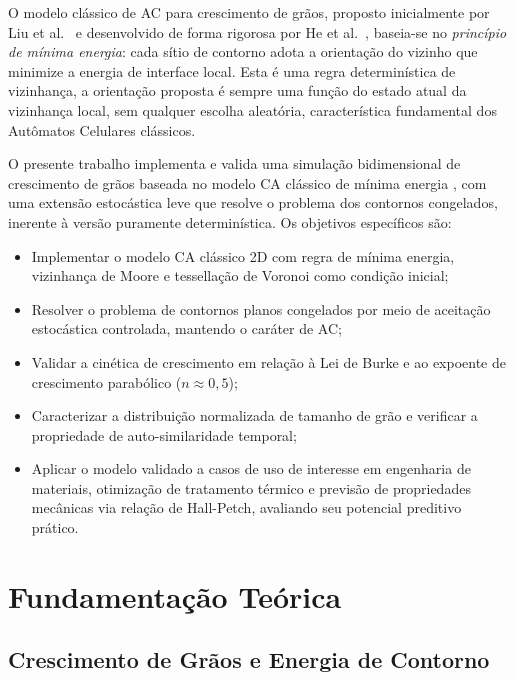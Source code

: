 \documentclass[12pt,a4paper]{article}
\begin{document}
O modelo clássico de AC para crescimento de grãos, proposto inicialmente por
Liu et al.\ \cite{liu1996} e desenvolvido de forma rigorosa por He et al.\ \cite{he2006},
baseia-se no \emph{princípio de mínima energia}: cada sítio de contorno adota a
orientação do vizinho que minimize a energia de interface local. Esta é uma regra
determinística de vizinhança, a orientação proposta é sempre uma função do estado
atual da vizinhança local, sem qualquer escolha aleatória, característica fundamental
dos Autômatos Celulares clássicos.

O presente trabalho implementa e valida uma simulação bidimensional de crescimento
de grãos baseada no modelo CA clássico de mínima energia \cite{he2006}, com uma
extensão estocástica leve que resolve o problema dos contornos congelados, inerente
à versão puramente determinística. Os objetivos específicos são:
\begin{itemize}
    \item Implementar o modelo CA clássico 2D com regra de mínima energia, vizinhança
          de Moore e tessellação de Voronoi como condição inicial;
    \item Resolver o problema de contornos planos congelados por meio de aceitação
          estocástica controlada, mantendo o caráter de AC;
    \item Validar a cinética de crescimento em relação à Lei de Burke e ao expoente de
          crescimento parabólico ($n \approx 0{,}5$);
    \item Caracterizar a distribuição normalizada de tamanho de grão e verificar a
          propriedade de auto-similaridade temporal;
    \item Aplicar o modelo validado a casos de uso de interesse em engenharia de
          materiais, otimização de tratamento térmico e previsão de propriedades
          mecânicas via relação de Hall-Petch, avaliando seu potencial preditivo
          prático.
\end{itemize}

\newpage

\section{Fundamentação Teórica}
\label{sec:fundamentacao}

\subsection{Crescimento de Grãos e Energia de Contorno}
\end{document}
